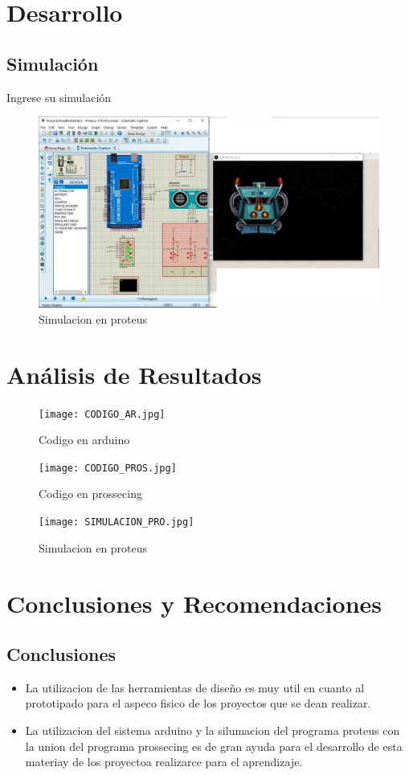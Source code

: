 \documentclass[10pt,a4paper]{article}
\begin{document}
\section{Desarrollo}

\subsection{Simulación}
Ingrese su simulación

\begin{figure}[ht!]
\caption{Simulacion en proteus}
\centering
\includegraphics[scale=0.5]{SIMULACION.jpg}
\end{figure} 


\section{Análisis de Resultados}
\begin{figure}[ht!]
\caption{Codigo en arduino}
\centering
\texttt{[image: CODIGO\_AR.jpg]}
\end{figure} 
\begin{figure}[ht!]
\caption{Codigo en prossecing}
\centering
\texttt{[image: CODIGO\_PROS.jpg]}
\end{figure} 
\begin{figure}[ht!]
\caption{Simulacion en proteus}
\centering
\texttt{[image: SIMULACION\_PRO.jpg]}
\end{figure} 

\section{Conclusiones y Recomendaciones}
\subsection{Conclusiones}
\begin{itemize}
\item La utilizacion de las herramientas de diseño es muy util en cuanto al prototipado para el aspeco fisico de los proyectos que se dean realizar.
\item La utilizacion del sistema arduino y la silumacion del programa proteus con la union del programa prossecing es de gran ayuda para el desarrollo de esta materiay de los proyectoa realizarce para el aprendizaje.
\end{itemize}
\\
\end{document}
